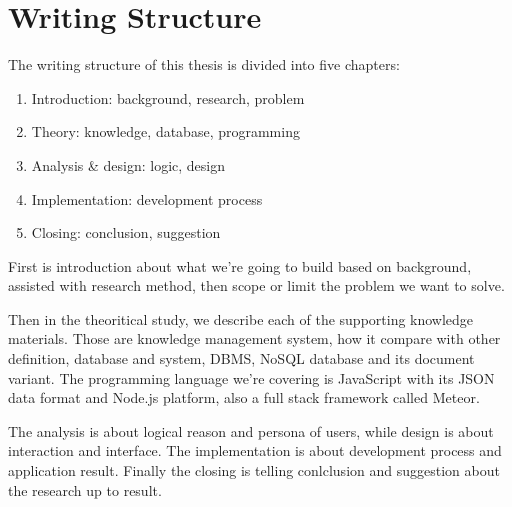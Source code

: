\section{Writing Structure}
\label{sec:writing-structure}

The writing structure of this thesis is divided into five chapters:

\begin{enumerate}
\item Introduction: background, research, problem
\item Theory: knowledge, database, programming
\item Analysis \& design: logic, design
\item Implementation: development process
\item Closing: conclusion, suggestion
\end{enumerate}

First is introduction about what we're going to build based on background, assisted with research method, then scope or limit the problem we want to solve.

Then in the theoritical study, we describe each of the supporting knowledge materials.
Those are knowledge management system, how it compare with other definition, database and system, \ac{DBMS}, \ac{NoSQL} database and its document variant.
The programming language we're covering is JavaScript with its JSON data format and Node.js platform, also a full stack framework called Meteor.

The analysis is about logical reason and persona of users, while design is about interaction and interface.
The implementation is about development process and application result.
Finally the closing is telling conlclusion and suggestion about the research up to result.
